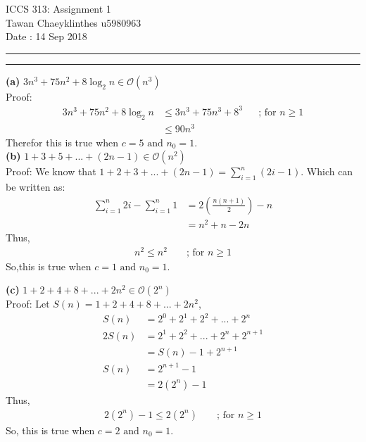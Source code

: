 \documentclass[a4paper, 12pt]{article}
\newcommand{\question}[1] {\vspace{.25in} \hrule\vspace{0.5em}
\noindent{\bf #1} \vspace{0.5em}
\hrule \vspace{.10in}}
\renewcommand{\part}[1] {\vspace{10pt} {\bf (#1)}}
\begin{document}
	\medskip
	
	\thispagestyle{plain}
	\begin{center}
		{\Large ICCS 313: Assignment 1} \\
		Tawan Chaeyklinthes u5980963 \\
		Date : 14 Sep 2018
	\end{center}
\question{Problem 1}
\part {a}
$3n^3 + 75n^2 + 8\log_2n \in \mathcal{O}(n^3)$ \\

Proof:
\begin{align*}
3n^3 + 75n^2 + 8\log_2n & \leqslant 3n^3 + 75n^3 + 8^3
&&\text{; for }n \geqslant 1 \\
& \leqslant 90n^3
\end{align*}
Therefor this is true when $c = 5 \text{ and } n_0 = 1$.\\

\part{b} $1+3+5+...+(2n-1) \in \mathcal{O}(n^2)$\\

Proof: We know that $1+2+3+...+(2n-1) = \sum_{i=1} ^{n} (2i-1)$. Which can be written as: 
\begin{align*}
	\sum_{i=1}^{n} 2i - \sum_{i=1}^{n} 1 & = 2({\frac{n(n+1)}2}) - n \\
	&= n^2 + n -2n
\end{align*} 
Thus,
\begin{align*}
	n^2 \leqslant n^2 &&\text{ ; for } n\geqslant 1 
\end{align*}
So,this is true when $c=1 \text{ and } n_0 = 1$.

\part{c}
$1+2+4+8+...+2n^2 \in \mathcal{O}(2^n)$\\

Proof: Let $S(n) = 1+2+4+8+...+2n^2$,
\begin{align*}
	S(n) &= 2^0+2^1+2^2+...+2^n\\
	2S(n) &= 2^1 + 2^2 +...+2^n+2^{n+1}\\
	&= S(n) - 1 + 2^{n+1}\\
	S(n)  &= 2^{n+1} -1\\
	&= 2(2^n) -1
\end{align*}
Thus,
\begin{align*}
	 2(2^{n}) -1 \leqslant 2(2^n) && \text{ ; for } n\geqslant 1
\end{align*}
So, this is true when $c = 2 \text{ and } n_0 = 1$.
\end{document}
